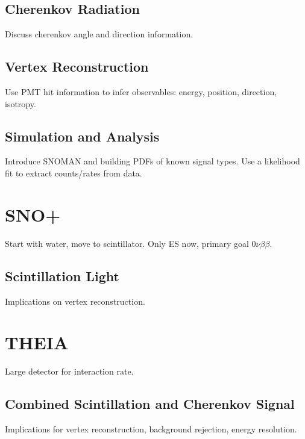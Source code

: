 \subsection{Cherenkov Radiation}

Discuss cherenkov angle and direction information.

\subsection{Vertex Reconstruction}

Use PMT hit information to infer observables: energy, position, direction, isotropy.

\subsection{Simulation and Analysis}

Introduce SNOMAN and building PDFs of known signal types.
Use a likelihood fit to extract counts/rates from data.


\section{SNO+}

Start with water, move to scintillator. Only ES now, primary goal 0$\nu\beta\beta$.

\subsection{Scintillation Light}

Implications on vertex reconstruction.

\section{T\textsc{HEIA}}

Large detector for interaction rate. 

\subsection{Combined Scintillation and Cherenkov Signal}

Implications for vertex reconstruction, background rejection, energy resolution.
